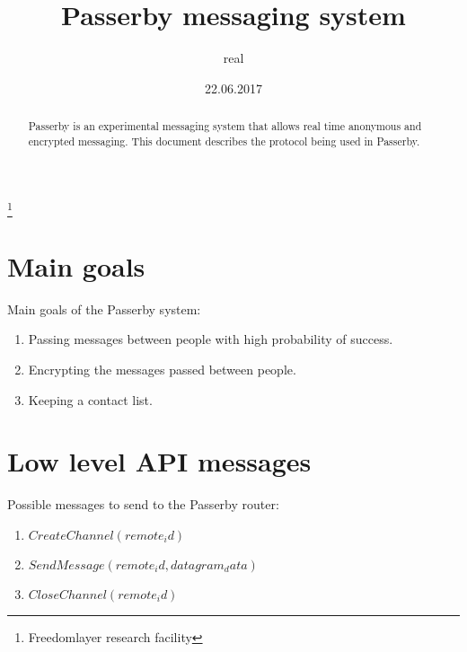 \documentclass{amsart}
\theoremstyle{definition}
\theoremstyle{remark}
\numberwithin{equation}{section}
\begin{document}
\title{Passerby messaging system}

\author{real}
\thanks{Freedomlayer research facility}



\date{22.06.2017}
\maketitle

\begin{abstract}
  Passerby is an experimental messaging system that allows real time anonymous
  and encrypted messaging. This document describes the protocol being used in
  Passerby.
\end{abstract}

\section{Main goals}

Main goals of the Passerby system:

\begin{enumerate}
  \item Passing messages between people with high probability of success.
  \item Encrypting the messages passed between people.
  \item Keeping a contact list.
\end{enumerate}


\section{Low level API messages}

Possible messages to send to the Passerby router:
\begin{enumerate}
  \item $CreateChannel (remote_id)$
  \item $SendMessage (remote_id, datagram_data)$
  \item $CloseChannel (remote_id)$
\end{enumerate}
\end{document}
